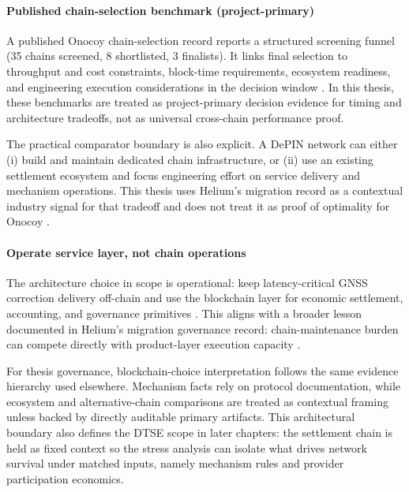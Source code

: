 \paragraph*{Published chain-selection benchmark (project-primary)}
A published Onocoy chain-selection record reports a structured screening funnel (35 chains screened, 8 shortlisted, 3 finalists). It links final selection to throughput and cost constraints, block-time requirements, ecosystem readiness, and engineering execution considerations in the decision window \cite{Ballandies2023ChainSelection}. In this thesis, these benchmarks are treated as project-primary decision evidence for timing and architecture tradeoffs, not as universal cross-chain performance proof.

The practical comparator boundary is also explicit. A DePIN network can either (i) build and maintain dedicated chain infrastructure, or (ii) use an existing settlement ecosystem and focus engineering effort on service delivery and mechanism operations. This thesis uses Helium's migration record as a contextual industry signal for that tradeoff and does not treat it as proof of optimality for Onocoy \cite{HeliumHIP70}.

\paragraph*{Operate service layer, not chain operations}
The architecture choice in scope is operational: keep latency-critical GNSS correction delivery off-chain and use the blockchain layer for economic settlement, accounting, and governance primitives \cite{OnocoyWhitepaper301, OnocoyToken}. This aligns with a broader lesson documented in Helium's migration governance record: chain-maintenance burden can compete directly with product-layer execution capacity \cite{HeliumHIP70}.

For thesis governance, blockchain-choice interpretation follows the same evidence hierarchy used elsewhere. Mechanism facts rely on protocol documentation, while ecosystem and alternative-chain comparisons are treated as contextual framing unless backed by directly auditable primary artifacts. This architectural boundary also defines the DTSE scope in later chapters: the settlement chain is held as fixed context so the stress analysis can isolate what drives network survival under matched inputs, namely mechanism rules and provider participation economics.


